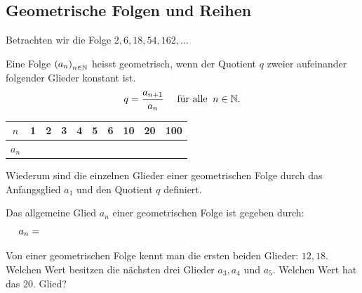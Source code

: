 \documentclass[11pt,oneside]{article}
\begin{document}
\subsection{Geometrische Folgen und Reihen}
	Betrachten wir die Folge $2,6,18,54,162,\ldots$
	\begin{definition}
		Eine Folge $\left(a_n\right)_{n\in\mathbb{N}}$ heisst geometrisch, wenn der Quotient $q$ zweier aufeinander folgender Glieder konstant ist. \[q=\frac{a_{n+1}}{a_n} \quad\text{ für alle }\:n\in\mathbb{N}.\]
	\end{definition}
	\begingroup
	\renewcommand{\arraystretch}{1.5}
	\begin{table}[H]
		\vspace{24pt}
		\centering
		\begin{tabular}{c|p{8mm}|p{8mm}|p{8mm}|p{8mm}|p{8mm}|p{10mm}|p{10mm}|p{15mm}|p{15mm}}
			$n$ & 1 & 2 & 3 & 4 & 5 & 6 & 10 & 20 & 100\\\hline
			$a_n$ & & & & & & & & &
		\end{tabular}
		\vspace{24pt}
	\end{table}
	\endgroup
	Wiederum sind die einzelnen Glieder einer geometrischen Folge durch das Anfangsglied $a_1$ und den Quotient $q$ definiert.
	\begin{satz}
		Das allgemeine Glied $a_n$ einer geometrischen Folge ist gegeben durch: \[a_n=\hspace*{11cm}\]
	\end{satz}\newpage
	\begin{beispiel}
		Von einer geometrischen Folge kennt man die ersten beiden Glieder: $12, 18$. Welchen Wert besitzen die nächsten drei Glieder $a_3, a_4$ und $a_5$. Welchen Wert hat das $20.$ Glied?\vspace{5pt}\newline{}
	\end{beispiel}
\end{document}
